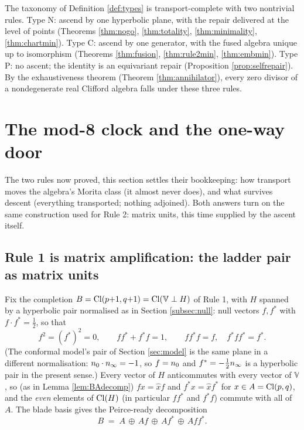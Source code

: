 \begin{corollary}\label{cor:norule}
The taxonomy of Definition \ref{def:types} is transport-complete with two nontrivial rules. Type N: ascend by one hyperbolic plane, with the repair delivered at the level of points (Theorems \ref{thm:nogo}, \ref{thm:totality}, \ref{thm:minimality}, \ref{thm:chartmin}). Type C: ascend by one generator, with the fused algebra unique up to isomorphism (Theorems \ref{thm:fusion}, \ref{thm:rule2min}, \ref{thm:embmin}). Type P: no ascent; the identity is an equivariant repair (Proposition \ref{prop:selfrepair}). By the exhaustiveness theorem (Theorem \ref{thm:annihilator}), every zero divisor of a nondegenerate real Clifford algebra falls under these three rules.
\end{corollary}

\section{The mod-8 clock and the one-way door}\label{sec:clock}

The two rules now proved, this section settles their bookkeeping: how transport moves the algebra's Morita class (it almost never does), and what survives descent (everything transported; nothing adjoined). Both answers turn on the same construction used for Rule 2: matrix units, this time supplied by the ascent itself.

\subsection{Rule 1 is matrix amplification: the ladder pair as matrix units}\label{subsec:morita}

Fix the completion $B = \mathrm{Cl}(p{+}1, q{+}1) = \mathrm{Cl}(\mathbb{V} \perp H)$ of Rule 1, with $H$ spanned by a hyperbolic pair normalised as in Section \ref{subsec:null}: null vectors $f, f^*$ with $f \cdot f^* = \tfrac12$, so that
\[
f^2 = (f^*)^2 = 0, \qquad ff^* + f^*f = 1, \qquad ff^*f = f, \quad f^*ff^* = f^* .
\]
(The conformal model's pair of Section \ref{sec:model} is the same plane in a different normalisation: $n_0 \cdot n_\infty = -1$, so $f = n_0$ and $f^* = -\tfrac12n_\infty$ is a hyperbolic pair in the present sense.) Every vector of $H$ anticommutes with every vector of $\mathbb{V}$, so (as in Lemma \ref{lem:BAdecomp}) $f x = \hat{x} f$ and $f^* x = \hat{x} f^*$ for $x \in A = \mathrm{Cl}(p,q)$, and the \emph{even} elements of $\mathrm{Cl}(H)$ (in particular $ff^*$ and $f^*f$) commute with all of $A$. The blade basis gives the Peirce-ready decomposition
\[
B \;=\; A \,\oplus\, Af \,\oplus\, Af^* \,\oplus\, Aff^* .
\]

